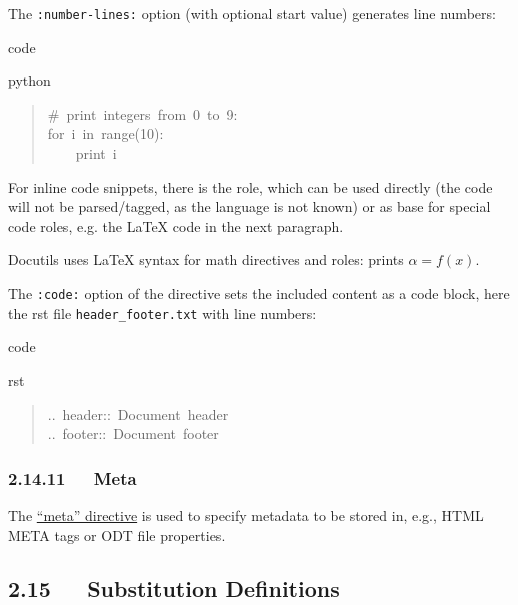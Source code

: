 \documentclass[a4paper]{article}
\begin{document}
The \texttt{:number-lines:} option (with optional start value) generates line
numbers:

\begin{DUclass}{code}
\begin{DUclass}{python}
\begin{quote}
\ttfamily\raggedright
{}\#~print~integers~from~0~to~9:\\
for~i~in~range(10):\\
~~~~print~i
\end{quote}
\end{DUclass}
\end{DUclass}

For inline code snippets, there is the  role, which can be used
directly (the code will not be parsed/tagged, as the language is not known)
or as base for special code roles, e.g. the LaTeX code in the next
paragraph.

Docutils uses LaTeX syntax for math directives and roles:
\texttt{} prints $\alpha = f(x)$.

The \texttt{:code:} option of the  directive sets the included content
as a code block, here the rst file \texttt{header\_footer.txt} with line numbers:

\begin{DUclass}{code}
\begin{DUclass}{rst}
\begin{quote}
\ttfamily\raggedright
{}..~header::~Document~header\\
..~footer::~Document~footer
\end{quote}
\end{DUclass}
\end{DUclass}


\subsubsection{2.14.11   Meta%
  \label{meta}%
}

The \href{https://docutils.sourceforge.io/docs/ref/rst/directives.html\#metadata}{“meta” directive} is used to specify metadata to be stored in,
e.g., HTML META tags or ODT file properties.


\subsection{2.15   Substitution Definitions%
  \label{substitution-definitions}%
}
\end{document}

